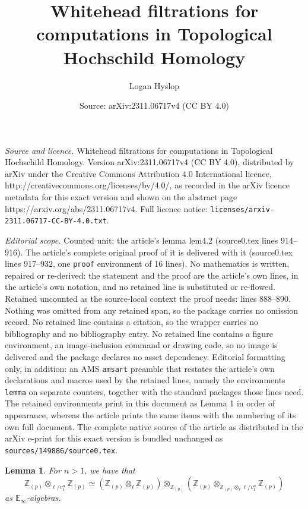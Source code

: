 \documentclass[10pt,a4paper]{amsart}
\title{Whitehead filtrations for computations in Topological Hochschild Homology}
\author{Logan Hyslop}
\date{Source: arXiv:2311.06717v4 (CC BY 4.0)}
\newtheorem{lemma}{Lemma}
\newcommand{\bb}[1]{\mathbb{#1}}
\newcommand{\zz}{\mathbb{Z}}
\begin{document}
\maketitle

\noindent\emph{Source and licence.} Whitehead filtrations for computations in Topological Hochschild Homology. Version arXiv:2311.06717v4 (CC BY 4.0), distributed by arXiv under the Creative Commons Attribution 4.0 International licence, http://creativecommons.org/licenses/by/4.0/, as recorded in the arXiv licence metadata for this exact version and shown on the abstract page https://arxiv.org/abs/2311.06717v4. Full licence notice: \texttt{licenses/arxiv-2311.06717-CC-BY-4.0.txt}.\par\smallskip

\noindent\textit{Editorial scope.} Counted unit: the article's lemma lem4.2 (source0.tex lines 914--916). The article's complete original proof of it is delivered with it (source0.tex lines 917--932, one \texttt{proof} environment of 16 lines). No mathematics is written, repaired or re-derived: the statement and the proof are the article's own lines, in the article's own notation, and no retained line is substituted or re-flowed.  Retained uncounted as the source-local context the proof needs: lines 888--890.  Nothing was omitted from any retained span, so the package carries no omission record.  No retained line contains a citation, so the wrapper carries no bibliography and no bibliography entry.  No retained line contains a figure environment, an image-inclusion command or drawing code, so no image is delivered and the package declares no asset dependency.  Editorial formatting only, in addition: an AMS \texttt{amsart} preamble that restates the article's own declarations and macros used by the retained lines, namely the environments \texttt{lemma} on separate counters, together with the standard packages those lines need.  The retained environments print in this document as Lemma 1 in order of appearance, whereas the article prints the same items with the numbering of its own full document.  The complete native source of the article as distributed in the arXiv e-print for this exact version is bundled unchanged as \texttt{sources/149886/source0.tex}.
\begin{lemma}\label{lem4.1}
	For $n>1$, we have that $$\zz_{(p)}\otimes_{\ell/v_1^n}\zz_{(p)}\simeq (\zz_{(p)}\otimes_{\ell}\zz_{(p)})\otimes_{\zz_{(p)}}(\zz_{(p)}\otimes_{\zz_{(p)}\otimes_{\ell}\ell/v_1^n}\zz_{(p)})$$ as $\bb{E}_\infty$-algebras.
\end{lemma}
\end{document}
